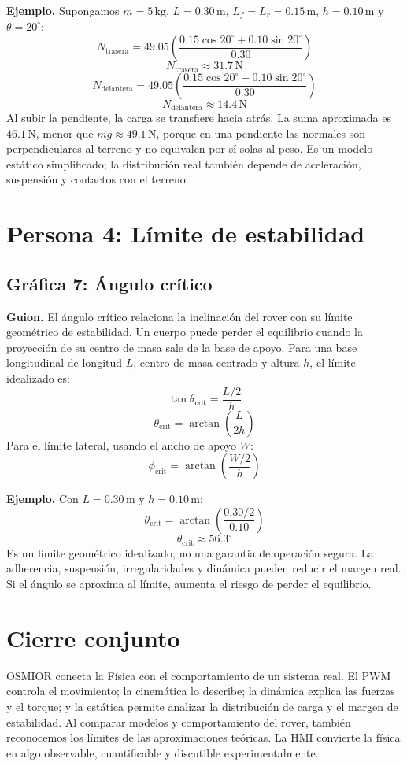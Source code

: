 \documentclass[12pt,a4paper]{article}
\begin{document}
\textbf{Ejemplo.} Supongamos \(m=5\,\mathrm{kg}\), \(L=0.30\,\mathrm{m}\), \(L_f=L_r=0.15\,\mathrm{m}\), \(h=0.10\,\mathrm{m}\) y \(\theta=20^\circ\):
\[
N_{\mathrm{trasera}}=
49.05\left(\frac{0.15\cos20^\circ+0.10\sin20^\circ}{0.30}\right)
\]
\[
\boxed{N_{\mathrm{trasera}}\approx31.7\,\mathrm{N}}
\]
\[
N_{\mathrm{delantera}}=
49.05\left(\frac{0.15\cos20^\circ-0.10\sin20^\circ}{0.30}\right)
\]
\[
\boxed{N_{\mathrm{delantera}}\approx14.4\,\mathrm{N}}
\]
Al subir la pendiente, la carga se transfiere hacia atrás. La suma aproximada es \(46.1\,\mathrm{N}\), menor que \(mg\approx49.1\,\mathrm{N}\), porque en una pendiente las normales son perpendiculares al terreno y no equivalen por sí solas al peso. Es un modelo estático simplificado; la distribución real también depende de aceleración, suspensión y contactos con el terreno.

\section{Persona 4: Límite de estabilidad}
\subsection{Gráfica 7: Ángulo crítico}
\textbf{Guion.} El ángulo crítico relaciona la inclinación del rover con su límite geométrico de estabilidad. Un cuerpo puede perder el equilibrio cuando la proyección de su centro de masa sale de la base de apoyo. Para una base longitudinal de longitud \(L\), centro de masa centrado y altura \(h\), el límite idealizado es:
\[
\tan\theta_{\mathrm{crit}}=\frac{L/2}{h}
\]
\[
\boxed{\theta_{\mathrm{crit}}=\arctan\left(\frac{L}{2h}\right)}
\]
Para el límite lateral, usando el ancho de apoyo \(W\):
\[
\boxed{\phi_{\mathrm{crit}}=\arctan\left(\frac{W/2}{h}\right)}
\]

\textbf{Ejemplo.} Con \(L=0.30\,\mathrm{m}\) y \(h=0.10\,\mathrm{m}\):
\[
\theta_{\mathrm{crit}}=\arctan\left(\frac{0.30/2}{0.10}\right)
\]
\[
\boxed{\theta_{\mathrm{crit}}\approx56.3^\circ}
\]
Es un límite geométrico idealizado, no una garantía de operación segura. La adherencia, suspensión, irregularidades y dinámica pueden reducir el margen real. Si el ángulo se aproxima al límite, aumenta el riesgo de perder el equilibrio.

\section*{Cierre conjunto}
OSMIOR conecta la Física con el comportamiento de un sistema real. El PWM controla el movimiento; la cinemática lo describe; la dinámica explica las fuerzas y el torque; y la estática permite analizar la distribución de carga y el margen de estabilidad. Al comparar modelos y comportamiento del rover, también reconocemos los límites de las aproximaciones teóricas. La HMI convierte la física en algo observable, cuantificable y discutible experimentalmente.
\end{document}
